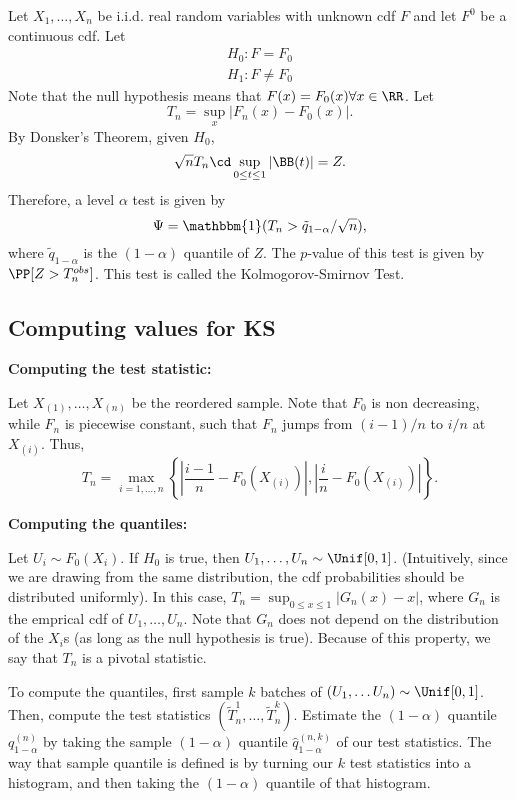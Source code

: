 Let $X_1, \hdots, X_n$ be i.i.d. real random variables with unknown cdf $F$ and let $F^0$ be a continuous cdf. Let
\begin{align*}
    H_0 : F=F_0\\
    H_1 : F\neq F_0
\end{align*}
Note that the null hypothesis means that $F(x) = F_0(x)\forall x\in \RR$. Let 
\[T_n = \sup_{x}\vert F_n(x) - F_0(x)\vert.\]
By Donsker's Theorem, given $H_0$, 
\[\sqrt{n}T_n\cd \sup_{0\leq t\leq 1}\vert \BB(t)\vert=Z.\]
Therefore, a level $\alpha$ test is given by 
\[\Psi = \mathbbm{1}(T_n > \tilde{q}_{1-\alpha}/\sqrt{n}),\]
where $\tilde{q}_{1-\alpha}$ is the $(1-\alpha)$ quantile of $Z$. The $p$-value of this test is given by $\PP[Z > T_n^{obs}]$. This test is called the \ac{Kolmogorov-Smirnov Test}. 

\subsection{Computing values for KS}

\textbf{Computing the test statistic:}

Let $X_{(1)}, \hdots, X_{(n)}$ be the reordered sample. Note that $F_0$ is non decreasing, while $F_n$ is piecewise constant, such that $F_n$ jumps from $(i-1)/n$ to $i/n$ at $X_{(i)}$. Thus, 
\[T_n = \max_{i=1,\hdots, n}\left\{\left\vert\frac{i-1}{n}-F_0(X_{(i)})\right\vert, \left\vert\frac{i}{n}-F_0(X_{(i)})\right\vert\right\}.\]


\noindent\textbf{Computing the quantiles: }

Let $U_i\sim F_0(X_i)$. If $H_0$ is true, then $U_1, \hdots, U_n\sim \Unif[0,1]$. (Intuitively, since we are drawing from the same distribution, the cdf probabilities should be distributed uniformly). In this case, $T_n=\sup_{0\leq x\leq 1}\vert G_n(x)-x\vert$, where $G_n$ is the emprical cdf of $U_1,\hdots, U_n$. Note that $G_n$ does not depend on the distribution of the $X_i$s (as long as the null hypothesis is true). Because of this property, we say that $T_n$ is a \ac{pivotal statistic}.

To compute the quantiles, first sample $k$ batches of $(U_1, \hdots U_n)\sim \Unif[0,1]$. Then, compute the test statistics $(\tilde{T}_n^{1}, \hdots, \tilde{T}_n^{k})$. Estimate the $(1-\alpha)$ quantile $q_{1-\alpha}^{(n)}$ by taking the sample $(1-\alpha)$ quantile $\hat{q}_{1-\alpha}^{(n,k)}$ of our test statistics. The way that sample quantile is defined is by turning our $k$ test statistics into a histogram, and then taking the $(1-\alpha)$ quantile of that histogram. 

